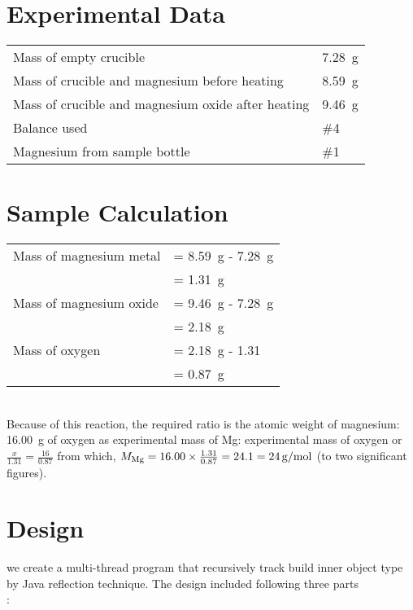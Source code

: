 \documentclass{article}
\begin{document}

\section{Experimental Data}

\begin{tabular}{ll}
Mass of empty crucible & \SI{7.28}{g}\\
Mass of crucible and magnesium before heating & \SI{8.59}{g}\\
Mass of crucible and magnesium oxide after heating & \SI{9.46}{g}\\
Balance used & \#4\\
Magnesium from sample bottle & \#1
\end{tabular}


\section{Sample Calculation}

\begin{tabular}{ll}
Mass of magnesium metal & = \SI{8.59}{g} - \SI{7.28}{g}\\
& = \SI{1.31}{g}\\
Mass of magnesium oxide & = \SI{9.46}{g} - \SI{7.28}{g}\\
& = \SI{2.18}{g}\\
Mass of oxygen & = \SI{2.18}{g} - \SI{1.31}{}\\
& = \SI{0.87}{g}
\end{tabular}\\
Because of this reaction, the required ratio is the atomic weight of magnesium: \SI{16.00}{g} of oxygen as experimental mass of Mg: experimental mass of oxygen or $\frac{x}{1.31}=\frac{16}{0.87}$ from which, $M_{\ce{Mg}} = 16.00 \times \frac{1.31}{0.87} = 24.1 = \SI{24}{g/mol}$ (to two significant figures).


\section{Design}
we create a multi-thread program that recursively track build inner object type
 by Java reflection technique. The design included following three parts\\:
\end{document}
